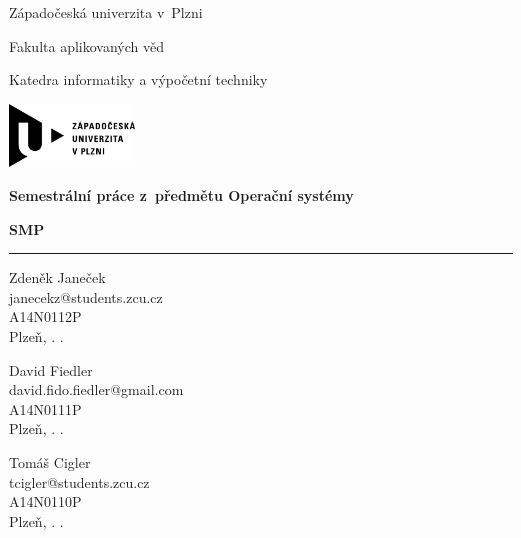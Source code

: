 \documentclass[a4paper,12pt]{article}
\begin{document}
\begin{titlepage}

\sffamily	%

	\begin{center}
		\begin{Large}
		
		Západočeská univerzita v~Plzni

		\vspace*{0.2cm}
		
		Fakulta aplikovaných věd

		\vspace*{0.2cm}
		
		Katedra informatiky a výpočetní techniky
		
		\vspace*{5mm}

		\includegraphics[width=0.25\textwidth]{obrazky/logo_zcu}	
		
		\vspace*{2cm}
		
		{\Huge\bfseries Semestrální práce z~předmětu Operační systémy}

		\vspace*{1cm}
		
		{\bfseries SMP}
		\end{Large}
	\end{center}
	
	\vfill

	\hrule
	
	\vspace*{0.2cm}	
	
	\noindent
	Zdeněk Janeček \\ 
	janecekz@students.zcu.cz \\
	A14N0112P \\
	Plzeň, \number\day. \number\month. \number\year

	\vspace*{0.2cm}	
	
	\noindent
	David Fiedler \\ 
	david.fido.fiedler@gmail.com \\
	A14N0111P \\
	Plzeň, \number\day. \number\month. \number\year
	
	\vspace*{0.2cm}	
	
	\noindent
	Tomáš Cigler \\ 
	tcigler@students.zcu.cz \\
	A14N0110P \\
	Plzeň, \number\day. \number\month. \number\year

\rmfamily	%

\end{titlepage}
\end{document}
